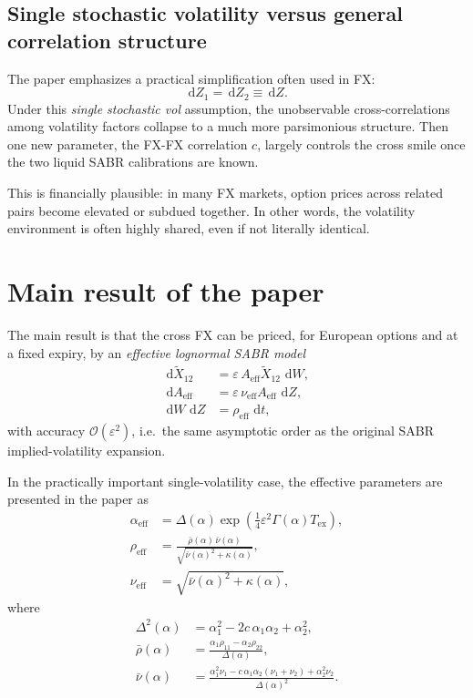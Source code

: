 \documentclass[11pt]{article}
\newcommand{\dd}{\,\mathrm{d}}
\newcommand{\eps}{\varepsilon}
\newcommand{\X}{\widetilde{X}}
\newcommand{\Order}[1]{\mathcal{O}\!\left(#1\right)}
\begin{document}
\subsection*{Single stochastic volatility versus general correlation structure}

The paper emphasizes a practical simplification often used in FX:
\[
\dd Z_1=\dd Z_2 \equiv \dd Z.
\]
Under this \emph{single stochastic vol} assumption, the unobservable cross-correlations among volatility factors collapse to a much more parsimonious structure. Then one new parameter, the FX-FX correlation \(c\), largely controls the cross smile once the two liquid SABR calibrations are known.

This is financially plausible: in many FX markets, option prices across related pairs become elevated or subdued together. In other words, the volatility environment is often highly shared, even if not literally identical.

\section{Main result of the paper}

The main result is that the cross FX can be priced, for European options and at a fixed expiry, by an \emph{effective lognormal SABR model}
\begin{align}
\dd \X_{12} &= \eps\, A_{\mathrm{eff}} \X_{12}\,\dd W, \\
\dd A_{\mathrm{eff}} &= \eps\, \nu_{\mathrm{eff}} A_{\mathrm{eff}}\,\dd Z, \\
\dd W\,\dd Z &= \rho_{\mathrm{eff}}\,\dd t,
\end{align}
with accuracy \(\Order{\eps^2}\), i.e.\ the same asymptotic order as the original SABR implied-volatility expansion.

In the practically important single-volatility case, the effective parameters are presented in the paper as
\begin{align}
\alpha_{\mathrm{eff}}
&= \Delta(\alpha)\exp\!\left(\frac14 \eps^2 \Gamma(\alpha)T_{\mathrm{ex}}\right), \label{eq:alphaeff}\\
\rho_{\mathrm{eff}}
&= \frac{\bar\rho(\alpha)\,\bar\nu(\alpha)}
{\sqrt{\bar\nu(\alpha)^2+\kappa(\alpha)}}, \label{eq:rhoeff}\\
\nu_{\mathrm{eff}}
&= \sqrt{\bar\nu(\alpha)^2+\kappa(\alpha)}, \label{eq:nueff}
\end{align}
where
\begin{align}
\Delta^2(\alpha) &= \alpha_1^2-2c\,\alpha_1\alpha_2+\alpha_2^2, \label{eq:Delta}\\
\bar\rho(\alpha) &= \frac{\alpha_1\rho_{11}-\alpha_2\rho_{22}}{\Delta(\alpha)}, \\
\bar\nu(\alpha) &=
\frac{\alpha_1^2\nu_1-c\,\alpha_1\alpha_2(\nu_1+\nu_2)+\alpha_2^2\nu_2}
{\Delta(\alpha)^2}. \label{eq:bar-nu}
\end{align}
\end{document}
